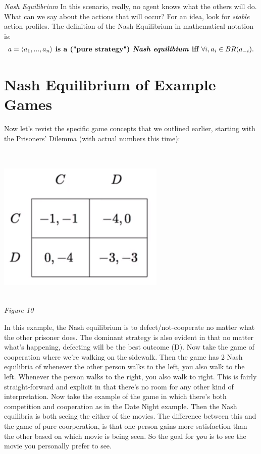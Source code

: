 \documentclass{article}
\begin{document}
\vskip 0.1in
\emph{Nash Equilibrium}
\vskip 0.1in
In this scenario, really, no agent knows what the others will do. What can we say about the actions that will occur? For an idea, look for \emph{stable} action profiles. The definition of the Nash Equilibrium in mathematical notation is:
\begin{align}
    a = \langle a_{1}, ..., a_{n}\rangle \textbf{ is a ("pure strategy") \emph{Nash equilibium} iff } \forall i, a_{i} \in BR(a_{-i}).
\end{align}

\section{Nash Equilibrium of Example Games}

Now let's revist the specific game concepts that we outlined earlier, starting with the Prisoners' Dilemma (with actual numbers this time):
\begin{center}
    \includegraphics[width = 8cm, height = 8cm]{IMG_010.png} \\
    \emph{Figure 10}
\end{center}
In this example, the Nash equilibrium is to defect/not-cooperate no matter what the other prisoner does. The dominant strategy is also evident in that no matter what's happening, defecting will be the best outcome (D). 
\vskip 0.1in 
Now take the game of cooperation where we're walking on the sidewalk. Then the game has 2 Nash equilibria of whenever the other person walks to the left, you also walk to the left. Whenever the person walks to the right, you also walk to right. This is fairly straight-forward and explicit in that there's no room for any other kind of interpretation. 
\vskip 0.1in
Now take the example of the game in which there's both competition and cooperation as in the Date Night example. Then the Nash equilibria is both seeing the either of the movies. The difference between this and the game of pure coorperation, is that one person gains more satisfaction than the other based on which movie is being seen. So the goal for \emph{you} is to see the movie you personally prefer to see.
\end{document}
